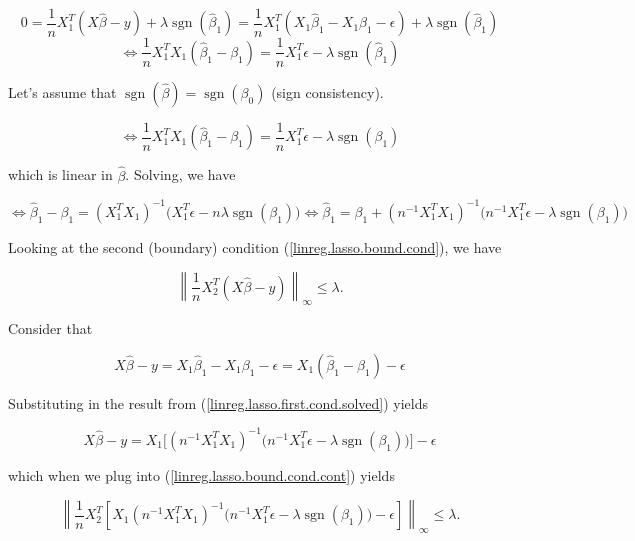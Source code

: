\[
0 = \frac{1}{n} X_1^T(X \hat{\beta} - y) + \lambda  \operatorname{sgn}(\hat{\beta}_1) = \frac{1}{n} X_1^T(X_1 \hat{\beta}_1 - X_1 \beta_1 - \epsilon) + \lambda  \operatorname{sgn}(\hat{\beta}_1) 
\]
\[
 \iff \frac{1}{n} X_1^TX_1 (\hat{\beta}_1 - \beta_1)  =  \frac{1}{n} X_1^T \epsilon - \lambda  \operatorname{sgn}(\hat{\beta}_1)
 \]
 
 Let's assume that \(\operatorname{sgn}(\hat{\beta}) = \operatorname{sgn}(\beta_0)\) (sign consistency).
 
 \[
  \iff \frac{1}{n} X_1^TX_1 (\hat{\beta}_1 - \beta_1)  =  \frac{1}{n} X_1^T \epsilon - \lambda  \operatorname{sgn}(\beta_1)
  \]
  
  which is linear in \(\hat{\beta}\). Solving, we have
  
\begin{equation}\label{linreg.lasso.first.cond.solved}
  \iff  \hat{\beta}_1 - \beta_1  =  ( X_1^TX_1)^{-1} \big( X_1^T \epsilon - n  \lambda  \operatorname{sgn}(\beta_1)\big)   \iff  \hat{\beta}_1   = \beta_1 +   ( n^{-1}X_1^TX_1)^{-1} \big( n^{-1} X_1^T \epsilon -   \lambda  \operatorname{sgn}(\beta_1) \big)
\end{equation}

Looking at the second (boundary) condition (\ref{linreg.lasso.bound.cond}), we have

\begin{equation}\label{linreg.lasso.bound.cond.cont}
\left\lVert \frac{1}{n} X_{2}^T (X \hat{\beta} - y) \right\rVert_\infty \leq \lambda.
\end{equation}

Consider that 

\[
X \hat{\beta}- y = X_1 \hat{\beta}_1 - X_1 \beta_1 - \epsilon = X_1(\hat{\beta}_1 - \beta_1) - \epsilon
\]

Substituting in the result from (\ref{linreg.lasso.first.cond.solved}) yields

\[
X \hat{\beta}- y  = X_1\big[  ( n^{-1} X_1^TX_1)^{-1} \big( n^{-1} X_1^T \epsilon -  \lambda  \operatorname{sgn}(\beta_1)\big)   \big] - \epsilon
\]

which when we plug into (\ref{linreg.lasso.bound.cond.cont}) yields

\[
\left\lVert \frac{1}{n} X_{2}^T \left[X_1  (n^{-1} X_1^TX_1)^{-1} \big( n^{-1} X_1^T \epsilon -  \lambda  \operatorname{sgn}(\beta_1)\big) - \epsilon\right] \right\rVert_\infty \leq \lambda.
\]

